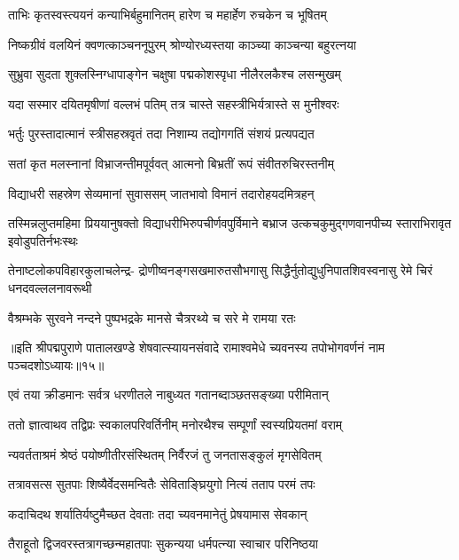 \twolineshloka
{ताभिः कृतस्वस्त्ययनं कन्याभिर्बहुमानितम्}
{हारेण च महार्हेण रुचकेन च भूषितम्}%

\twolineshloka
{निष्कग्रीवं वलयिनं क्वणत्काञ्चननूपुरम्}
{श्रोण्योरध्यस्तया काञ्च्या काञ्चन्या बहुरत्नया}%

\twolineshloka
{सुभ्रुवा सुदता शुक्लस्निग्धापाङ्गेन चक्षुषा}
{पद्मकोशस्पृधा नीलैरलकैश्च लसन्मुखम्}%

\twolineshloka
{यदा सस्मार दयितमृषीणां वल्लभं पतिम्}
{तत्र चास्ते सहस्त्रीभिर्यत्रास्ते स मुनीश्वरः}%

\twolineshloka
{भर्तुः पुरस्तादात्मानं स्त्रीसहस्रवृतं तदा}
{निशाम्य तद्योगगतिं संशयं प्रत्यपद्यत}%

\twolineshloka
{सतां कृत मलस्नानां विभ्राजन्तीमपूर्ववत्}
{आत्मनो बिभ्रतीं रूपं संवीतरुचिरस्तनीम्}%

\twolineshloka
{विद्याधरी सहस्रेण सेव्यमानां सुवाससम्}
{जातभावो विमानं तदारोहयदमित्रहन्}%

\fourlineindentedshloka
{तस्मिन्नलुप्तमहिमा प्रिययानुषक्तो}
{विद्याधरीभिरुपचीर्णवपुर्विमाने}
{बभ्राज उत्कचकुमुद्गणवानपीच्य}
{स्ताराभिरावृत इवोडुपतिर्नभःस्थः}%

\fourlineindentedshloka
{तेनाष्टलोकपविहारकुलाचलेन्द्र-}
{द्रोणीष्वनङ्गसखमारुतसौभगासु}
{सिद्धैर्नुतोद्युधुनिपातशिवस्वनासु}
{रेमे चिरं धनदवल्ललनावरूथी}%

\twolineshloka
{वैश्रम्भके सुरवने नन्दने पुष्पभद्रके}
{मानसे चैत्ररथ्ये च सरे मे रामया रतः}%

{॥इति श्रीपद्मपुराणे पातालखण्डे शेषवात्स्यायनसंवादे रामाश्वमेधे च्यवनस्य तपोभोगवर्णनं नाम पञ्चदशोऽध्यायः॥१५॥}

\resetShloka


\twolineshloka
{एवं तया क्रीडमानः सर्वत्र धरणीतले}
{नाबुध्यत गतानब्दाञ्छतसङ्ख्या परीमितान्}%

\twolineshloka
{ततो ज्ञात्वाथव तद्विप्रः स्वकालपरिवर्तिनीम्}
{मनोरथैश्च सम्पूर्णां स्वस्यप्रियतमां वराम्}%

\twolineshloka
{न्यवर्तताश्रमं श्रेष्ठं पयोष्णीतीरसंस्थितम्}
{निर्वैरजं तु जनतासङ्कुलं मृगसेवितम्}%

\twolineshloka
{तत्रावसत्स सुतपाः शिष्यैर्वेदसमन्वितैः}
{सेविताङ्घ्रियुगो नित्यं तताप परमं तपः}%

\twolineshloka
{कदाचिदथ शर्यातिर्यष्टुमैच्छत देवताः}
{तदा च्यवनमानेतुं प्रेषयामास सेवकान्}%

\twolineshloka
{तैराहूतो द्विजवरस्तत्रागच्छन्महातपाः}
{सुकन्यया धर्मपत्न्या स्वाचार परिनिष्ठया}%

